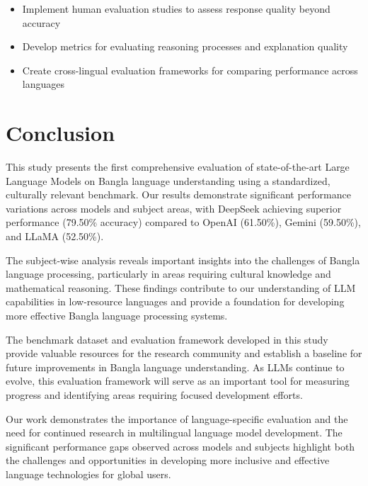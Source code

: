 \documentclass[11pt,a4paper]{article}
\begin{document}
\begin{itemize}
    \item Implement human evaluation studies to assess response quality beyond accuracy
    \item Develop metrics for evaluating reasoning processes and explanation quality
    \item Create cross-lingual evaluation frameworks for comparing performance across languages
\end{itemize}

\section{Conclusion}

This study presents the first comprehensive evaluation of state-of-the-art Large Language Models on Bangla language understanding using a standardized, culturally relevant benchmark. Our results demonstrate significant performance variations across models and subject areas, with DeepSeek achieving superior performance (79.50\% accuracy) compared to OpenAI (61.50\%), Gemini (59.50\%), and LLaMA (52.50\%).

The subject-wise analysis reveals important insights into the challenges of Bangla language processing, particularly in areas requiring cultural knowledge and mathematical reasoning. These findings contribute to our understanding of LLM capabilities in low-resource languages and provide a foundation for developing more effective Bangla language processing systems.

The benchmark dataset and evaluation framework developed in this study provide valuable resources for the research community and establish a baseline for future improvements in Bangla language understanding. As LLMs continue to evolve, this evaluation framework will serve as an important tool for measuring progress and identifying areas requiring focused development efforts.

Our work demonstrates the importance of language-specific evaluation and the need for continued research in multilingual language model development. The significant performance gaps observed across models and subjects highlight both the challenges and opportunities in developing more inclusive and effective language technologies for global users.
\end{document}
